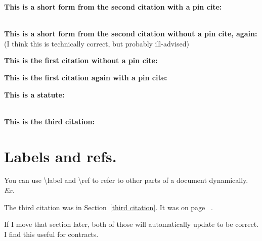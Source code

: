 \documentclass[12pt]{article}
\begin{document}
\textbf{This is a short form from the second citation with a pin cite:}\\
\lipsum[1]~\cite[130]{Gordon2000}

\textbf{This is a short form from the second citation without a pin cite, again:}\\
\cite{Gordon2000} (I think this is technically correct, but probably ill-advised)

\textbf{This is the first citation without a pin cite:}\\
\cite{Northland2020}

\textbf{This is the first citation again with a pin cite: }\\
\cite[411]{Northland2020}


\textbf{This is a statute:}\\
~\cite{NTV}

\textbf{This is the third citation:}\\
\cite[275]{Kaigler1997}\label{third citation}

\clearpage

\section{Labels and refs.}
You can use \textbackslash{}label and \textbackslash{}ref to refer to other parts of a document dynamically. \emph{Ex.}

The third citation was in Section~\ref{third citation}. It was on page ~\pageref{third citation}.

If I move that section later, both of those will automatically update to be correct. I find this useful for contracts.
\end{document}
